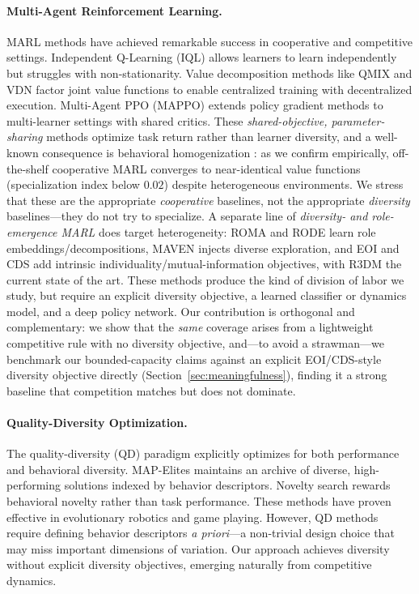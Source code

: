 \documentclass{article}
\begin{document}
\paragraph{Multi-Agent Reinforcement Learning.}
MARL methods have achieved remarkable success in cooperative and competitive settings. Independent Q-Learning (IQL) \cite{tan1993multi} allows learners to learn independently but struggles with non-stationarity. Value decomposition methods like QMIX \cite{rashid2018qmix} and VDN factor joint value functions to enable centralized training with decentralized execution. Multi-Agent PPO (MAPPO) \cite{yu2022surprising} extends policy gradient methods to multi-learner settings with shared critics. These \emph{shared-objective, parameter-sharing} methods optimize task return rather than learner diversity, and a well-known consequence is behavioral homogenization \cite{li2021cds}: as we confirm empirically, off-the-shelf cooperative MARL converges to near-identical value functions (specialization index below $0.02$) despite heterogeneous environments. We stress that these are the appropriate \emph{cooperative} baselines, not the appropriate \emph{diversity} baselines---they do not try to specialize. A separate line of \emph{diversity- and role-emergence MARL} does target heterogeneity: ROMA \cite{wang2020roma} and RODE \cite{wang2021rode} learn role embeddings/decompositions, MAVEN \cite{mahajan2019maven} injects diverse exploration, and EOI \cite{jiang2021eoi} and CDS \cite{li2021cds} add intrinsic individuality/mutual-information objectives, with R3DM \cite{goel2025r3dm} the current state of the art. These methods produce the kind of division of labor we study, but require an explicit diversity objective, a learned classifier or dynamics model, and a deep policy network. Our contribution is orthogonal and complementary: we show that the \emph{same} coverage arises from a lightweight competitive rule with no diversity objective, and---to avoid a strawman---we benchmark our bounded-capacity claims against an explicit EOI/CDS-style diversity objective directly (Section~\ref{sec:meaningfulness}), finding it a strong baseline that competition matches but does not dominate.

\paragraph{Quality-Diversity Optimization.}
The quality-diversity (QD) paradigm explicitly optimizes for both performance and behavioral diversity. MAP-Elites \cite{mouret2015illuminating} maintains an archive of diverse, high-performing solutions indexed by behavior descriptors. Novelty search \cite{lehman2011evolving} rewards behavioral novelty rather than task performance. These methods have proven effective in evolutionary robotics and game playing. However, QD methods require defining behavior descriptors \emph{a priori}---a non-trivial design choice that may miss important dimensions of variation. Our approach achieves diversity without explicit diversity objectives, emerging naturally from competitive dynamics.
\end{document}
